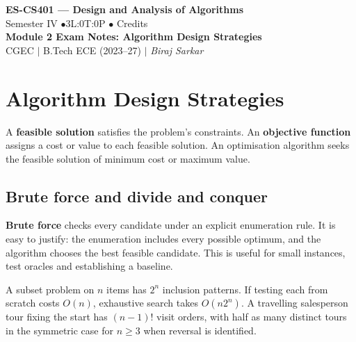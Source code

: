 \documentclass[12pt,a4paper]{article}
\begin{document}
\begin{center}
  {\LARGE\bfseries\color{myred} ES-CS401 --- Design and Analysis of Algorithms}\\[5pt]
  {\normalsize\color{mydark} Semester IV \quad$\bullet$\quad 3L:0T:0P \quad$\bullet$ Credits}\\[3pt]
  {\normalsize\color{myteal}\textbf{Module 2 Exam Notes: Algorithm Design Strategies}}\\[3pt]
  {\small\color{mydark} CGEC \;$|$\; B.Tech ECE (2023--27) \;$|$\; \textit{Biraj Sarkar}}
\end{center}
\vspace{2pt}
\noindent{\color{myred}\rule{\linewidth}{1.5pt}}
\vspace{2pt}

\hypersetup{linkcolor=mydark}
\tableofcontents
\hypersetup{linkcolor=myteal}
\newpage

\section{Algorithm Design Strategies}
\begin{tcolorbox}[defbox, title={Feasible solutions and objective functions}]
A \textbf{feasible solution} satisfies the problem's constraints. An \textbf{objective function} assigns a cost or value to each feasible solution. An optimisation algorithm seeks the feasible solution of minimum cost or maximum value.
\end{tcolorbox}

\subsection{Brute force and divide and conquer}
\textbf{Brute force} checks every candidate under an explicit enumeration rule. It is easy to justify: the enumeration includes every possible optimum, and the algorithm chooses the best feasible candidate. This is useful for small instances, test oracles and establishing a baseline.
\begin{tcolorbox}[examplebox, title={Counting exhaustive candidates}]
A subset problem on $n$ items has $2^n$ inclusion patterns. If testing each from scratch costs $O(n)$, exhaustive search takes $O(n2^n)$. A travelling salesperson tour fixing the start has $(n-1)!$ visit orders, with half as many distinct tours in the symmetric case for $n\ge3$ when reversal is identified.
\end{tcolorbox}
\end{document}
